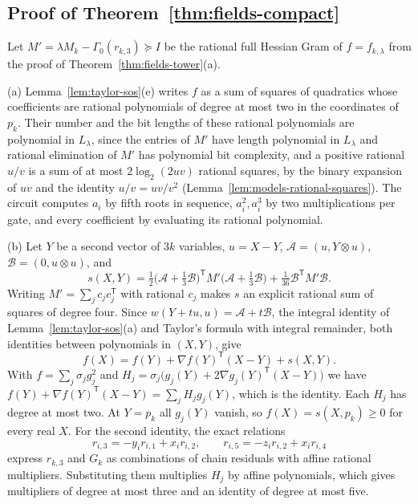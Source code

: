 \subsection{Proof of Theorem~\ref{thm:fields-compact}}
\label{app:fields-compact}

Let $M'=\lambda M_k-\Gamma_0(r_{k,3})\succeq I$ be the rational full Hessian
Gram of $f=f_{k,\lambda}$ from the proof of Theorem~\ref{thm:fields-tower}(a).

(a) Lemma~\ref{lem:taylor-sos}(e) writes $f$ as a sum of squares of
quadratics whose coefficients are rational polynomials of degree at most two
in the coordinates of $p_k$. Their number and the bit lengths of these
rational polynomials are polynomial in $L_\lambda$, since the entries of $M'$
have length polynomial in $L_\lambda$ and rational elimination of $M'$ has
polynomial bit complexity, and a positive rational $u/v$ is a sum of at most
$2\log_2(2uv)$ rational squares, by the binary expansion of $uv$ and the
identity $u/v=uv/v^2$ (Lemma~\ref{lem:models-rational-squares}). The circuit
computes $a_i$ by fifth roots in sequence, $a_i^2,a_i^3$ by two
multiplications per gate, and every coefficient by evaluating its rational
polynomial.

(b) Let $Y$ be a second vector of $3k$ variables, $u=X-Y$,
$\mathcal A=(u,Y\otimes u)$, $\mathcal B=(0,u\otimes u)$, and
\[
 s(X,Y)=\tfrac12\bigl(\mathcal A+\tfrac13\mathcal B\bigr)^{\mathsf T}M'
   \bigl(\mathcal A+\tfrac13\mathcal B\bigr)+\tfrac1{36}\mathcal B^{\mathsf T}M'\mathcal B .
\]
Writing $M'=\sum_jc_jc_j^{\mathsf T}$ with rational $c_j$ makes $s$ an explicit
rational sum of squares of degree four. Since
$w(Y+tu,u)=\mathcal A+t\mathcal B$, the integral identity of
Lemma~\ref{lem:taylor-sos}(a) and Taylor's formula with integral remainder,
both identities between polynomials in $(X,Y)$, give
\[
 f(X)=f(Y)+\nabla f(Y)^{\mathsf T}(X-Y)+s(X,Y).
\]
With $f=\sum_j\sigma_jg_j^2$ and
$H_j=\sigma_j\bigl(g_j(Y)+2\nabla g_j(Y)^{\mathsf T}(X-Y)\bigr)$ we have
$f(Y)+\nabla f(Y)^{\mathsf T}(X-Y)=\sum_jH_jg_j(Y)$, which is the identity.
Each $H_j$ has degree at most two. At $Y=p_k$ all $g_j(Y)$ vanish, so
$f(X)=s(X,p_k)\ge0$ for every real $X$. For the second identity, the exact
relations
\[
 r_{i,3}=-y_ir_{i,1}+x_ir_{i,2},\qquad r_{i,5}=-z_ir_{i,2}+x_ir_{i,4}
\]
express $r_{k,3}$ and $G_k$ as combinations of chain residuals with affine
rational multipliers. Substituting them multiplies $H_j$ by affine
polynomials, which gives multipliers of degree at most three and an identity
of degree at most five.

